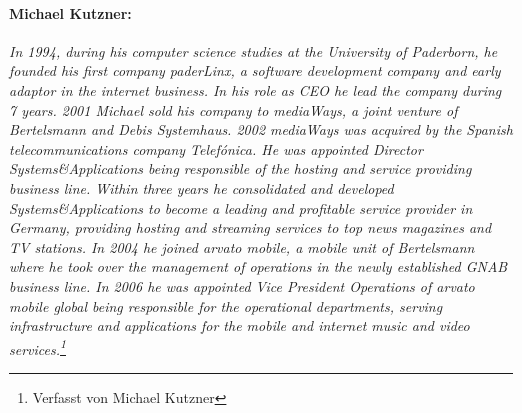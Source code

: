 \paragraph{Michael Kutzner:} \textit{In 1994, during his computer science studies at the University of Paderborn, he founded his first company paderLinx, a software development company and early adaptor in the internet business. In his role as CEO he lead the company during 7 years. 2001 Michael sold his company to mediaWays, a joint venture of Bertelsmann and Debis Systemhaus. 2002 mediaWays was acquired by the Spanish telecommunications company Telefónica. He was appointed Director Systems\&Applications being responsible of the hosting and service providing business line. Within three years he consolidated and developed Systems\&Applications to become a leading and profitable service provider in Germany, providing hosting and streaming services to top news magazines and TV stations.
In 2004 he joined arvato mobile, a mobile unit of Bertelsmann where he took over the management of operations in the newly established GNAB business line. In 2006 he was appointed Vice President Operations of arvato mobile global being responsible for the operational departments, serving infrastructure and applications for the mobile and internet music and video services.\footnote{Verfasst von Michael Kutzner}}